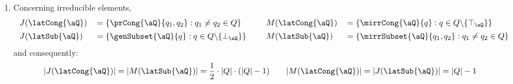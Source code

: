 \documentclass{article}
\begin{document}
\begin{lemma}
\begin{enumerate}
\item
Concerning irreducible elements,
\[
\begin{tabular}{lllll}
$J(\latCong{\aQ})$ & $= \{ \prCong{\aQ}{q_1,q_2} : q_1 \neq q_2 \in Q \}$
&&
$M(\latCong{\aQ})$ & $= \{ \mirrCong{\aQ}{q} : q \in Q \backslash \{\top_\aQ\} \}$
\\[1ex]
$J(\latSub{\aQ})$ & $= \{ \genSubset{\aQ}{q} : q \in Q \backslash \{\bot_\aQ\} \}$
&&
$M(\latSub{\aQ})$ & $= \{ \mirrSubset{\aQ}{q_1,q_2} : q_1 \neq q_2 \in Q \}$
\end{tabular}
\]
and consequently:
\[
|J(\latCong{\aQ})| = |M(\latSub{\aQ})| = \frac{1}{2} \cdot |Q| \cdot (|Q| - 1)
\qquad
|M(\latCong{\aQ})| = |J(\latSub{\aQ})| = |Q| - 1
\]

\end{enumerate}
\end{lemma}
\end{document}
